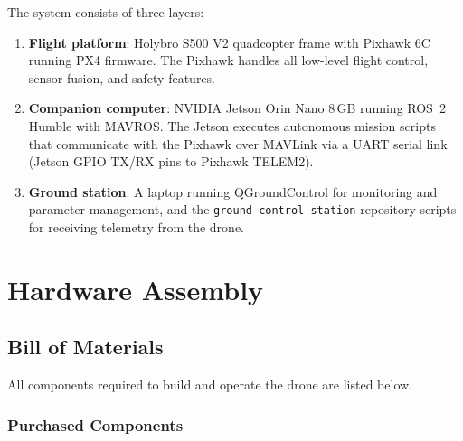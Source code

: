 \documentclass{article}
\begin{document}
The system consists of three layers:

\begin{enumerate}
    \item \textbf{Flight platform}: Holybro S500 V2 quadcopter frame with Pixhawk 6C running PX4 firmware. The Pixhawk handles all low-level flight control, sensor fusion, and safety features.
    \item \textbf{Companion computer}: NVIDIA Jetson Orin Nano 8\,GB running ROS~2 Humble with MAVROS. The Jetson executes autonomous mission scripts that communicate with the Pixhawk over MAVLink via a UART serial link (Jetson GPIO TX/RX pins to Pixhawk TELEM2).
    \item \textbf{Ground station}: A laptop running QGroundControl for monitoring and parameter management, and the \texttt{ground-control-station} repository scripts for receiving telemetry from the drone.
\end{enumerate}

\section{Hardware Assembly}

\subsection{Bill of Materials}

All components required to build and operate the drone are listed below.

\subsubsection{Purchased Components}
\end{document}
